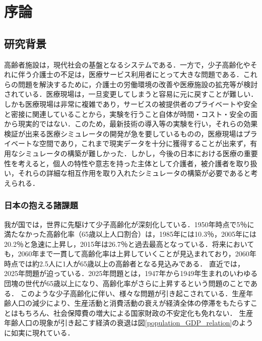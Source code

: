 \chapter{序論}

\section{研究背景}

高齢者施設は，現代社会の基盤となるシステムである．一方で，少子高齢化やそれに伴う介護士の不足は，医療サービス利用者にとって大きな問題である．これらの問題を解決するために，介護士の労働環境の改善や医療施設の拡充等が検討されている．医療現場は，一旦変更してしまうと容易に元に戻すことが難しい．しかも医療現場は非常に複雑であり，サービスの被提供者のプライベートや安全と密接に関連していることから，実験を行うこと自体が時間・コスト・安全の面から現実的ではない．このため，最新技術の導入等の実験を行い，それらの効果検証が出来る医療シミュレータの開発が急を要しているものの，医療現場はプライベートな空間であり，これまで現実データを十分に獲得することが出来ず，有用なシミュレータの構築が難しかった．しかし，今後の日本における医療の重要性を考えると，個人の特性や意志を持った主体として介護者，被介護者を取り扱い，それらの詳細な相互作用を取り入れたシミュレータの構築が必要であると考えられる．

\subsection{日本の抱える諸課題}

我が国では，世界に先駆けて少子高齢化が深刻化している．1950年時点で5％に満たなかった高齢化率（65歳以上人口割合）は，1985年には10.3％，2005年には20.2％と急速に上昇し，2015年は26.7％と過去最高となっている．将来においても，2060年まで一貫して高齢化率は上昇していくことが見込まれており，2060年時点では約2.5人に1人が65歳以上の高齢者となる見込みである\cite{ex_kousei_v1}．
直近では，2025年問題が迫っている．2025年問題とは，1947年から1949年生まれのいわゆる団塊の世代が65歳以上になり、高齢化率がさらに上昇するという問題のことである\cite{2025_problem}．
このような少子高齢化に伴い、様々な問題が引き起こされている．生産年齢人口の減少により、生産活動と消費活動の衰えが経済全体の停滞をもたらすことはもちろん、社会保障費の増大による国家財政の不安定化も免れない．
生産年齢人口の現象が引き起こす経済の衰退は図\ref{population_GDP_relation}のように如実に現れている．

